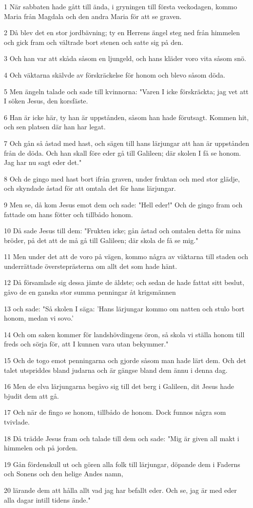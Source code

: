 \par 1 När sabbaten hade gått till ända, i gryningen till första veckodagen, kommo Maria från Magdala och den andra Maria för att se graven.
\par 2 Då blev det en stor jordbävning; ty en Herrens ängel steg ned från himmelen och gick fram och vältrade bort stenen och satte sig på den.
\par 3 Och han var att skåda såsom en ljungeld, och hans kläder voro vita såsom snö.
\par 4 Och väktarna skälvde av förskräckelse för honom och blevo såsom döda.
\par 5 Men ängeln talade och sade till kvinnorna: "Varen I icke förskräckta; jag vet att I söken Jesus, den korsfäste.
\par 6 Han är icke här, ty han är uppstånden, såsom han hade förutsagt. Kommen hit, och sen platsen där han har legat.
\par 7 Och gån så åstad med hast, och sägen till hans lärjungar att han är uppstånden från de döda. Och han skall före eder gå till Galileen; där skolen I få se honom. Jag har nu sagt eder det."
\par 8 Och de gingo med hast bort ifrån graven, under fruktan och med stor glädje, och skyndade åstad för att omtala det för hans lärjungar.
\par 9 Men se, då kom Jesus emot dem och sade: "Hell eder!" Och de gingo fram och fattade om hans fötter och tillbådo honom.
\par 10 Då sade Jesus till dem: "Frukten icke; gån åstad och omtalen detta för mina bröder, på det att de må gå till Galileen; där skola de få se mig."
\par 11 Men under det att de voro på vägen, kommo några av väktarna till staden och underrättade översteprästerna om allt det som hade hänt.
\par 12 Då församlade sig dessa jämte de äldste; och sedan de hade fattat sitt beslut, gåvo de en ganska stor summa penningar åt krigsmännen
\par 13 och sade: "Så skolen I säga: 'Hans lärjungar kommo om natten och stulo bort honom, medan vi sovo.'
\par 14 Och om saken kommer för landshövdingens öron, så skola vi ställa honom till freds och sörja för, att I kunnen vara utan bekymmer."
\par 15 Och de togo emot penningarna och gjorde såsom man hade lärt dem. Och det talet utspriddes bland judarna och är gängse bland dem ännu i denna dag.
\par 16 Men de elva lärjungarna begåvo sig till det berg i Galileen, dit Jesus hade bjudit dem att gå.
\par 17 Och när de fingo se honom, tillbådo de honom. Dock funnos några som tvivlade.
\par 18 Då trädde Jesus fram och talade till dem och sade: "Mig är given all makt i himmelen och på jorden.
\par 19 Gån fördenskull ut och gören alla folk till lärjungar, döpande dem i Faderns och Sonens och den helige Andes namn,
\par 20 lärande dem att hålla allt vad jag har befallt eder. Och se, jag är med eder alla dagar intill tidens ände."


